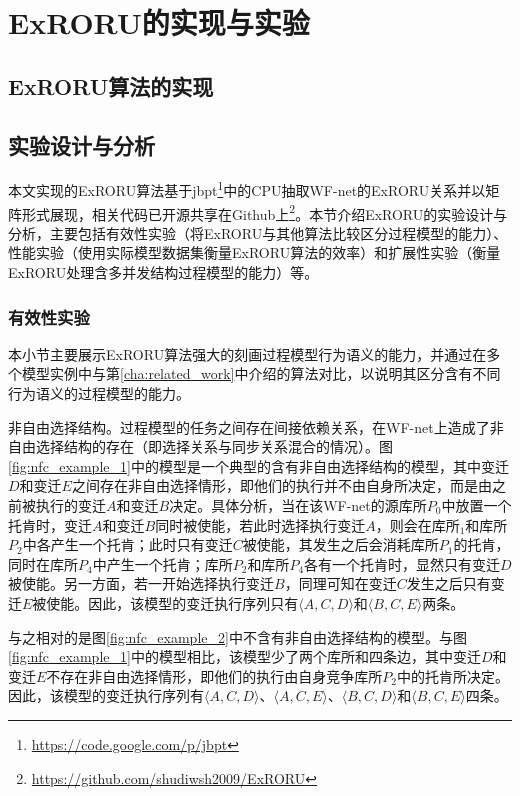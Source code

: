 \chapter{ExRORU的实现与实验}\label{cha:experiment}

\section{ExRORU算法的实现}\label{sec:implementation}

\section{实验设计与分析}\label{sec:experiment}
本文实现的ExRORU算法基于jbpt\footnote{\url{https://code.google.com/p/jbpt}}中的CPU抽取WF-net的ExRORU关系并以矩阵形式展现，相关代码已开源共享在Github上\footnote{\url{https://github.com/shudiwsh2009/ExRORU}}。本节介绍ExRORU的实验设计与分析，主要包括有效性实验（将ExRORU与其他算法比较区分过程模型的能力）、性能实验（使用实际模型数据集衡量ExRORU算法的效率）和扩展性实验（衡量ExRORU处理含多并发结构过程模型的能力）等。

\subsection{有效性实验}\label{subsec:effectiveness}
本小节主要展示ExRORU算法强大的刻画过程模型行为语义的能力，并通过在多个模型实例中与第\ref{cha:related_work}中介绍的算法对比，以说明其区分含有不同行为语义的过程模型的能力。

{\heiti 非自由选择结构。}过程模型的任务之间存在间接依赖关系\cite{van2004workflow,van2003workflow,de2003workflow,van2004process}，在WF-net上造成了非自由选择结构的存在（即选择关系与同步关系混合的情况）。图\ref{fig:nfc_example_1}中的模型是一个典型的含有非自由选择结构的模型，其中变迁$D$和变迁$E$之间存在非自由选择情形，即他们的执行并不由自身所决定，而是由之前被执行的变迁$A$和变迁$B$决定。具体分析，当在该WF-net的源库所$P_{0}$中放置一个托肯时，变迁$A$和变迁$B$同时被使能，若此时选择执行变迁$A$，则会在库所$_{1}$和库所$P_{2}$中各产生一个托肯；此时只有变迁$C$被使能，其发生之后会消耗库所$P_{1}$的托肯，同时在库所$P_{4}$中产生一个托肯；库所$P_{2}$和库所$P_{4}$各有一个托肯时，显然只有变迁$D$被使能。另一方面，若一开始选择执行变迁$B$，同理可知在变迁$C$发生之后只有变迁$E$被使能。因此，该模型的变迁执行序列只有$\langle A,C,D\rangle$和$\langle B,C,E\rangle$两条。

与之相对的是图\ref{fig:nfc_example_2}中不含有非自由选择结构的模型。与图\ref{fig:nfc_example_1}中的模型相比，该模型少了两个库所和四条边，其中变迁$D$和变迁$E$不存在非自由选择情形，即他们的执行由自身竞争库所$P_{2}$中的托肯所决定。因此，该模型的变迁执行序列有$\langle A,C,D\rangle$、$\langle A,C,E\rangle$、$\langle B,C,D\rangle$和$\langle B,C,E\rangle$四条。

